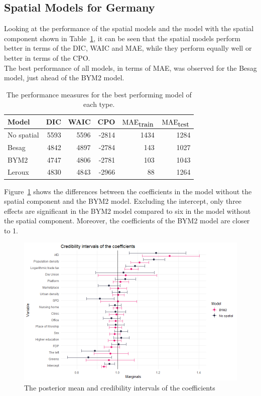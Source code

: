 \subsection{Spatial Models for Germany}\label{sec:spatial_germany}
Looking at the performance of the spatial models and the model with the spatial component shown in Table~\ref{allGermany}, it can be seen that the spatial models perform better in terms of the DIC, WAIC and MAE, while they perform equally well or better in terms of the CPO. \\
The best performance of all models, in terms of MAE, was observed for the Besag model, just ahead of the BYM2 model.
\begin{table}[H] 
\caption{The performance measures for the best performing model of each type. \label{allGermany}}
\begin{tabular}{l r r r r r}
\toprule
\textbf{Model}	& \textbf{DIC}	& \textbf{WAIC} & \textbf{CPO} & \textbf{$\hbox{MAE}_{\hbox{train}}$} & \textbf{$\hbox{MAE}_{\hbox{test}}$}\\
\midrule
No spatial & 5593 & 5596 & -2814 & 1434 & 1284 \\
Besag& 4842 & 4897 & -2784 & 143 & 1027\\
BYM2 & 4747 & 4806 & -2781 & 103 & 1043\\
Leroux & 4830 & 4843 & -2966 & 88 & 1264 \\
\bottomrule
\end{tabular}
\end{table}
Figure~\ref{intervalGermany} shows the differences between the coefficients in the model without the spatial component and the BYM2 model. Excluding the intercept, only three effects are significant in the BYM2 model compared to six in the model without the spatial component. Moreover, the coefficients of the BYM2 model are closer to 1. 
\begin{figure}[H]
  \centering
  \includegraphics[width = \textwidth]{intervals_germany.png}
  \caption{The posterior mean and credibility intervals of the coefficients}
  \label{intervalGermany}
\end{figure}
